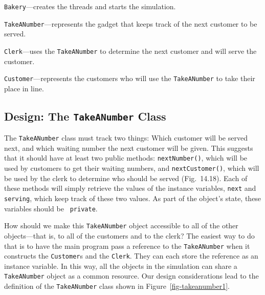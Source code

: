 \begin{BL}
\item  {\tt Bakery}---creates the threads and starts
the \mbox{simulation.}
\item  {\tt TakeANumber}---represents the gadget that keeps track of the
next customer to be served.
\item  {\tt Clerk}---uses the {\tt TakeANumber} to determine the
next customer and will serve the customer.
\item  {\tt Customer}---represents the customers who will use
the {\tt TakeANumber} to take their place in line.
\end{BL}


\subsection{Design: The {\tt TakeANumber} Class}
\noindent The {\tt TakeANumber} class must track two things: Which
customer will be served next, and which waiting number the next
customer will be given.  This suggests that it should have at least two
public methods: {\tt nextNumber()}, which will be used by customers to
get their waiting numbers, and {\tt nextCustomer()}, which will be used
by the clerk to determine who should be served (Fig.~14.18).
Each of these methods will simply retrieve the values of the instance
variables, {\tt next} and {\tt serving}, which keep track of these two
values.  As part of the object's state, these variables should be {\tt
private}.


How should we make this {\tt TakeANumber} object accessible to all of
the other objects---that is, to all of the customers and to the
clerk?  The easiest way to do that is to have the main program pass a
reference to the {\tt TakeANumber} when it constructs the
{\tt Customer}s and the {\tt Clerk}.  They can each store the reference as
an instance variable.   In this way, all the objects in the simulation
can share a {\tt TakeANumber} object as a common resource.
Our design considerations lead to the definition of
the {\tt TakeANumber} class shown in Figure~\ref{fig-takeanumber1}.

